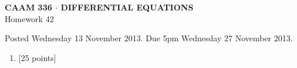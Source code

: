 \documentclass[10pt]{article}
\begin{document}
\vspace*{-5em}
\begin{center}
\large \textsf{\textbf{CAAM 336 $\cdot$ DIFFERENTIAL EQUATIONS}\\[0.5em]
Homework 42 }
\end{center}

Posted Wednesday 13 November 2013.  Due 5pm Wednesday 27 November 2013.

\begin{enumerate}\addtocounter{enumi}{41}
\item {[25 points]}  
\end{enumerate}
\end{document}
